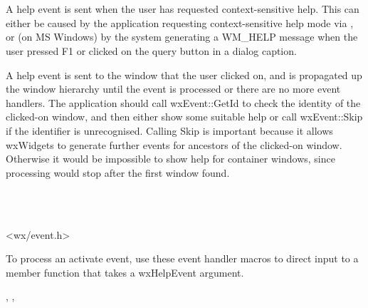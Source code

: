 \section{}\label{wxhelpevent}

A help event is sent when the user has requested context-sensitive help.
This can either be caused by the application requesting
context-sensitive help mode via , or
(on MS Windows) by the system generating a WM\_HELP message when the user pressed F1 or clicked
on the query button in a dialog caption.

A help event is sent to the window that the user clicked on, and is propagated up the
window hierarchy until the event is processed or there are no more event handlers.
The application should call wxEvent::GetId to check the identity of the clicked-on window,
and then either show some suitable help or call wxEvent::Skip if the identifier is unrecognised.
Calling Skip is important because it allows wxWidgets to generate further events for ancestors
of the clicked-on window. Otherwise it would be impossible to show help for container windows,
since processing would stop after the first window found.


\\
\\


<wx/event.h>




To process an activate event, use these event handler macros to direct input to a member
function that takes a wxHelpEvent argument.

\twocolwidtha{7cm}
\begin{twocollist}\itemsep=0pt
\end{twocollist}%


,\rtfsp
{},\rtfsp
{}

